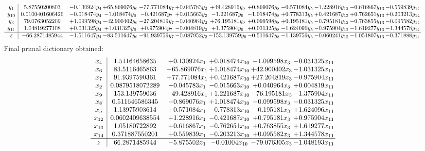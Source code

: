 \documentclass[11pt]{article}
\begin{document}
\[\begin{array}{c| c c@{\hskip 2pt} c@{\hskip 2pt} c@{\hskip 2pt} c@{\hskip 2pt} c@{\hskip 2pt} c@{\hskip 2pt} c@{\hskip 2pt} c@{\hskip 2pt} c@{\hskip 2pt} c@{\hskip 2pt} }
 y_{1}   &  5.87550200803 & -0.130924 y_{4} & + 65.869076 y_{6} & -77.771084 y_{7} & + 0.045783 y_{2} & + 49.428916 y_{9} & + 0.869076 y_{8} & -0.571084 y_{5} & -1.228916 y_{12} & -0.616867 y_{13} & -0.559839 y_{14}\\
 y_{10}   &  0.0100401606426 & -0.018474 y_{4} & -1.018474 y_{6} & -0.421687 y_{7} & + 0.015663 y_{2} & -1.221687 y_{9} & -1.018474 y_{8} & + 0.778313 y_{5} & + 0.421687 y_{12} & + 0.762651 y_{13} & + 0.203213 y_{14}\\
 y_{3}   &  79.0763052209 & + 1.099598 y_{4} & -42.900402 y_{6} & -27.204819 y_{7} & -0.040964 y_{2} & + 76.195181 y_{9} & + 0.099598 y_{8} & + 0.195181 y_{5} & -0.795181 y_{12} & -0.763855 y_{13} & -0.095582 y_{14}\\
 y_{11}   &  1.04819277108 & + 0.031325 y_{4} & + 1.031325 y_{6} & + 0.975904 y_{7} & -0.004819 y_{2} & + 1.375904 y_{9} & + 0.031325 y_{8} & -1.624096 y_{5} & -0.975904 y_{12} & -1.619277 y_{13} & -1.344578 y_{14}\\
\hline
z    &  -66.2871485944 & -1.511647 y_{4} & -83.511647 y_{6} & -91.939759 y_{7} & -0.087952 y_{2} & -153.139759 y_{9} & -0.511647 y_{8} & -1.139759 y_{5} & -0.060241 y_{12} & -1.051807 y_{13} & -0.371888 y_{14}\\
\end{array}\]
 Final primal dictionary obtained: 
\[\begin{array}{c| c c@{\hskip 2pt} c@{\hskip 2pt} c@{\hskip 2pt} c@{\hskip 2pt} }
 x_{4}   &  1.51164658635 & + 0.130924 x_{1} & + 0.018474 x_{10} & -1.099598 x_{3} & -0.031325 x_{11}\\
 x_{6}   &  83.5116465863 & -65.869076 x_{1} & + 1.018474 x_{10} & + 42.900402 x_{3} & -1.031325 x_{11}\\
 x_{7}   &  91.9397590361 & + 77.771084 x_{1} & + 0.421687 x_{10} & + 27.204819 x_{3} & -0.975904 x_{11}\\
 x_{2}   &  0.0879518072289 & -0.045783 x_{1} & -0.015663 x_{10} & + 0.040964 x_{3} & + 0.004819 x_{11}\\
 x_{9}   &  153.139759036 & -49.428916 x_{1} & + 1.221687 x_{10} & -76.195181 x_{3} & -1.375904 x_{11}\\
 x_{8}   &  0.511646586345 & -0.869076 x_{1} & + 1.018474 x_{10} & -0.099598 x_{3} & -0.031325 x_{11}\\
 x_{5}   &  1.13975903614 & + 0.571084 x_{1} & -0.778313 x_{10} & -0.195181 x_{3} & + 1.624096 x_{11}\\
 x_{12}   &  0.0602409638554 & + 1.228916 x_{1} & -0.421687 x_{10} & + 0.795181 x_{3} & + 0.975904 x_{11}\\
 x_{13}   &  1.05180722892 & + 0.616867 x_{1} & -0.762651 x_{10} & + 0.763855 x_{3} & + 1.619277 x_{11}\\
 x_{14}   &  0.371887550201 & + 0.559839 x_{1} & -0.203213 x_{10} & + 0.095582 x_{3} & + 1.344578 x_{11}\\
\hline
z    &  66.2871485944 & -5.875502 x_{1} & -0.01004 x_{10} & -79.076305 x_{3} & -1.048193 x_{11}\\
\end{array}\]
\end{document}
